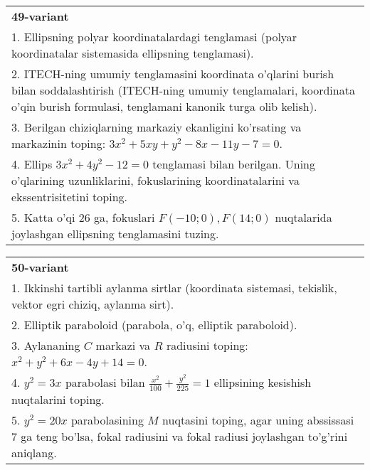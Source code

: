 \documentclass{article}
\begin{document}
\begin{tabular}{m{17cm}}
\textbf{49-variant}\\
1. Ellipsning polyar koordinatalardagi tenglamasi (polyar koordinatalar sistemasida ellipsning tenglamasi).\\

2. ITECH-ning umumiy tenglamasini koordinata o'qlarini burish bilan soddalashtirish (ITECH-ning umumiy tenglamalari, koordinata o'qin burish formulasi, tenglamani kanonik turga olib kelish).\\

3. Berilgan chiziqlarning markaziy ekanligini ko'rsating va markazinin toping: $3x^{2}+5xy+y^{2}-8x-11y-7=0$.\\

4. Ellips $3x^{2} + 4y^{2} - 12 = 0$ tenglamasi bilan berilgan. Uning o'qlarining uzunliklarini, fokuslarining koordinatalarini va ekssentrisitetini toping.  \\

5. Katta o'qi 26 ga, fokuslari $F( - 10;0), F(14;0)$ nuqtalarida joylashgan ellipsning tenglamasini tuzing.  
\end{tabular}
\vspace{1cm}


\begin{tabular}{m{17cm}}
\textbf{50-variant}\\
1. Ikkinshi tartibli aylanma sirtlar (koordinata sistemasi, tekislik, vektor egri chiziq, aylanma sirt).\\

2. Elliptik paraboloid (parabola, o'q, elliptik paraboloid).\\

3. Aylananing $C$ markazi va $R$ radiusini toping: $x^2+y^2+6x-4y+14=0$.\\

4. $y^{2} = 3x$ parabolasi bilan $\frac{x^{2}}{100} + \frac{y^{2}}{225} = 1$ ellipsining kesishish nuqtalarini toping.  \\

5. $y^{2} = 20x$ parabolasining $M$ nuqtasini toping, agar uning abssissasi 7 ga teng bo'lsa, fokal radiusini va fokal radiusi joylashgan to'g'rini aniqlang.
\end{tabular}
\vspace{1cm}
\end{document}
